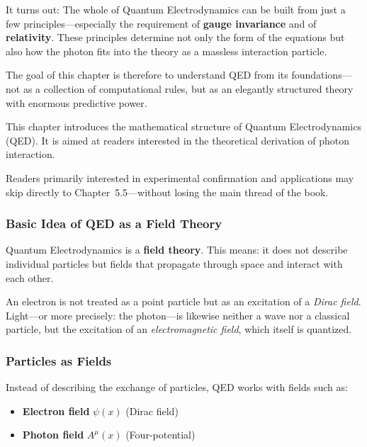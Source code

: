 It turns out: The whole of Quantum Electrodynamics can be built from just a few principles—especially the requirement of \textbf{gauge invariance} and of \textbf{relativity}. These principles determine not only the form of the equations but also how the photon fits into the theory as a massless interaction particle.

The goal of this chapter is therefore to understand QED from its foundations—not as a collection of computational rules, but as an elegantly structured theory with enormous predictive power.

\vspace{1em}
\begin{tcolorbox}[hinweisbox, title=Note for Readers]
	\label{box:Hinweis füe Leser}
	This chapter introduces the mathematical structure of Quantum Electrodynamics (QED). It is aimed at readers interested in the theoretical derivation of photon interaction. 
	
	Readers primarily interested in experimental confirmation and applications may skip directly to Chapter~5.5—without losing the main thread of the book.
\end{tcolorbox}


\subsubsection{Basic Idea of QED as a Field Theory}

Quantum Electrodynamics is a \textbf{field theory}. This means: it does not describe individual particles but fields that propagate through space and interact with each other.

An electron is not treated as a point particle but as an excitation of a \emph{Dirac field}. Light—or more precisely: the photon—is likewise neither a wave nor a classical particle, but the excitation of an \emph{electromagnetic field}, which itself is quantized.

\subsubsection*{Particles as Fields}
Instead of describing the exchange of particles, QED works with fields such as:
\begin{itemize}
	\item \textbf{Electron field} $\psi(x)$ (Dirac field)
	\item \textbf{Photon field} $A^\mu(x)$ (Four-potential)
\end{itemize}

